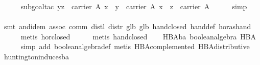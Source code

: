 \begin{isabellebody}
\ \ \ \ \isamarkupfalse%
\ {}subgoal{}tac\ {}y{}z\ {}\ carrier\ A{}\ {}x\ {}\ y\ {}\ carrier\ A{}\ {}x\ {}\ z\ {}\ carrier\ A{}{}\isanewline
\ \ \ \ \isamarkupfalse%
\ simp\isanewline
\ \ \ \ \isamarkupfalse%
\ {}smt\ and{}idem\ assoc\ comm\ distl\ distr\ glb{}\ glb{}\ hand{}closed\ hand{}def\ hor{}as{}hand{}\isanewline
\ \ \ \ \isamarkupfalse%
\ {}metis\ hor{}closed{}{}\isanewline
\ \ \ \ \isamarkupfalse%
\ {}metis\ hand{}closed{}%
\endisatagproof
{\isafoldproof}%
%
\isadelimproof
\isanewline
%
\endisadelimproof
\isanewline
\ \ \isamarkupfalse%
\ HBA{}ba{}\ {}boolean{}algebra\ HBA{}\isanewline
%
\isadelimproof
\ \ \ \ %
\endisadelimproof
%
\isatagproof
{}\isamarkupfalse%
\ {}simp\ add{}\ boolean{}algebra{}def{}\ metis\ HBA{}complemented\ HBA{}distributive{}%
\endisatagproof
{\isafoldproof}%
%
\isadelimproof
\isanewline
%
\endisadelimproof
\isanewline
{}\isamarkupfalse%
\isanewline
\isanewline
{}\isamarkupfalse%
\ huntington{}induces{}ba{}\isanewline

\end{isabellebody}
